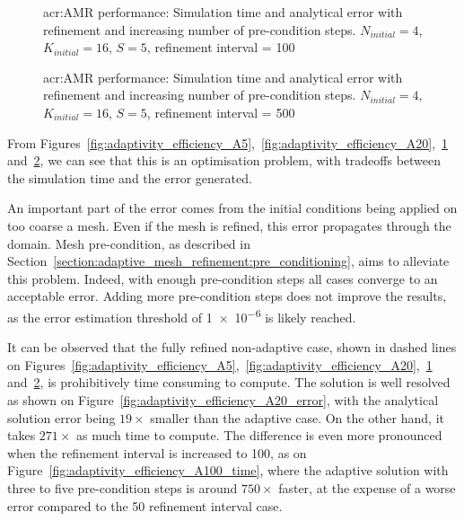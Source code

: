 \begin{figure}[H]
	\centering
	\hfill
	\caption{\Acrlong{acr:AMR} performance: Simulation time and analytical error with refinement and increasing number of pre-condition steps. \(N_{initial} = 4\), \(K_{initial} = 16\), \(S = 5\), refinement interval = 100}\label{fig:adaptivity_efficiency_A100}
\end{figure}

\begin{figure}[H]
	\centering
	\hfill
	\caption{\Acrlong{acr:AMR} performance: Simulation time and analytical error with refinement and increasing number of pre-condition steps. \(N_{initial} = 4\), \(K_{initial} = 16\), \(S = 5\), refinement interval = 500}\label{fig:adaptivity_efficiency_A500}
\end{figure}

From
Figures~\ref{fig:adaptivity_efficiency_A5},~\ref{fig:adaptivity_efficiency_A20},~\ref{fig:adaptivity_efficiency_A100}
and~\ref{fig:adaptivity_efficiency_A500}, we can see that this is an optimisation problem, with
tradeoffs between the simulation time and the error generated.

An important part of the error comes from the initial conditions being applied on too coarse a mesh.
Even if the mesh is refined, this error propagates through the domain. Mesh pre-condition, as
described in Section~\ref{section:adaptive_mesh_refinement:pre_conditioning}, aims to alleviate this
problem. Indeed, with enough pre-condition steps all cases converge to an acceptable error. Adding
more pre-condition steps does not improve the results, as the error estimation threshold of
\num{1e-6} is likely reached.

It can be observed that the fully refined non-adaptive case, shown in dashed lines on
Figures~\ref{fig:adaptivity_efficiency_A5},~\ref{fig:adaptivity_efficiency_A20},~\ref{fig:adaptivity_efficiency_A100}
and~\ref{fig:adaptivity_efficiency_A500}, is prohibitively time consuming to compute. The solution
is well resolved as shown on Figure~\ref{fig:adaptivity_efficiency_A20_error}, with the analytical
solution error being \(19 \times \) smaller than the adaptive case. On the other hand, it takes
\(271 \times \) as much time to compute. The difference is even more pronounced when the refinement
interval is increased to 100, as on Figure~\ref{fig:adaptivity_efficiency_A100_time}, where the
adaptive solution with three to five pre-condition steps is around \(750 \times \) faster, at the
expense of a worse error compared to the 50 refinement interval case.

